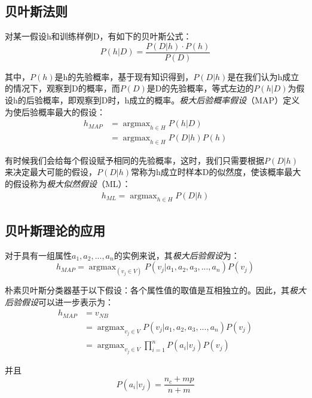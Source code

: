 \documentclass[a4papper]{article}
\begin{document}
\subsection{贝叶斯法则}
\par\setlength{\parindent}{2em} %
对某一假设h和训练样例D，有如下的贝叶斯公式：
\begin{equation*}
  P(h|D) = \frac{P(D|h) \cdot P(h)}{P(D)}
\end{equation*}
\par\setlength{\parindent}{2em} %
其中，$P(h)$是h的先验概率，基于现有知识得到，$P(D|h)$是在我们认为h成立的情况下，观察到D的概率，而$P(D)$是D的先验概率，等式左边的$P(h|D)$为假设h的后验概率，即观察到D时，h成立的概率。\emph{极大后验概率假设}（MAP）定义为使后验概率最大的假设：
\begin{align*}
h_{MAP} & = \mathop{argmax}_{h \in H} P(h|D)\\
& = \mathop{argmax}_{h \in H} P(D|h) P(h)
\end{align*}
\par\setlength{\parindent}{2em}
有时候我们会给每个假设赋予相同的先验概率，这时，我们只需要根据$P(D|h)$来决定最大可能的假设，$P(D|h)$常称为h成立时样本D的似然度，使该概率最大的假设称为\emph{极大似然假设}（ML）：
\begin{align*}
  h_{ML} = \mathop{argmax}_{h \in H} P(D|h)
\end{align*}
\subsection{贝叶斯理论的应用}
\par\setlength{\parindent}{2em}
对于具有一组属性${a_1, a_2, ...,a_n}$的实例来说，其\emph{极大后验假设}为：
\begin{equation*}
  h_{MAP} = \mathop{argmax}_(v_j \in V) P(v_j|a_1, a_2, a_3, ..., a_n)P(v_j)
\end{equation*}
\par\setlength{\parindent}{2em}
朴素贝叶斯分类器基于以下假设：各个属性值的取值是互相独立的。因此，其\emph{极大后验假设}可以进一步表示为：
\begin{align*}
   h_{MAP} & = v_{NB}\\
   & = \mathop{argmax}_{v_j \in V} P(v_j|a_1, a_2, a_3, ..., a_n)P(v_j) \\
   & = \mathop{argmax}_{v_j \in V} \prod _{i = 1} ^n P(a_i|v_j) P(v_j)
\end{align*}
\par\setlength{\parindent}{2em}
并且
\begin{equation*}
  P(a_i|v_j) = \frac{n_c + mp}{n+m}
\end{equation*}

\end{document}
